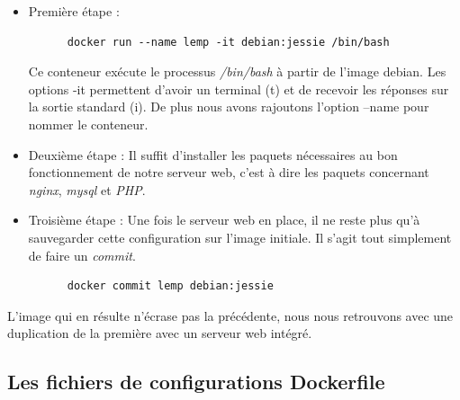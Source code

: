 \documentclass[12pt,a4paper]{article}
\begin{document}
\begin{itemize}
  \item{Première étape :}
    \begin{lstlisting}
      docker run --name lemp -it debian:jessie /bin/bash
    \end{lstlisting}
    Ce conteneur exécute le processus \textit{/bin/bash} à partir de l'image debian. Les options -it permettent d'avoir un terminal (t) et de recevoir les réponses sur la sortie standard (i). De plus nous avons rajoutons l'option --name pour nommer le conteneur.

  \item{Deuxième étape :}
    Il suffit d'installer les paquets nécessaires au bon fonctionnement de notre serveur web, c'est à dire les paquets concernant \textit{nginx}, \textit{mysql} et \textit{PHP}.

  \item{Troisième étape :}
    Une fois le serveur web en place, il ne reste plus qu'à sauvegarder cette configuration sur l'image initiale. Il s'agit tout simplement de faire un \textit{commit}.
    \begin{lstlisting}
      docker commit lemp debian:jessie
    \end{lstlisting}
\end{itemize}

L'image qui en résulte n'écrase pas la précédente, nous nous retrouvons avec une duplication de la première avec un serveur web intégré.

\subsection{Les fichiers de configurations Dockerfile}
\end{document}
